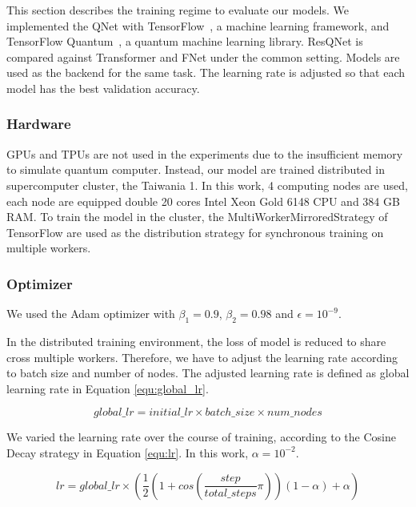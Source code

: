 This section describes the training regime to evaluate our models. We implemented the QNet with TensorFlow~\cite{abadi2016tensorflow}, a machine learning framework, and TensorFlow Quantum~\cite{broughton2020tensorflow}, a quantum machine learning library.
ResQNet is compared against Transformer and FNet under the common setting. Models are used as the backend for the same task. The learning rate is adjusted so that each model has the best validation accuracy.

\subsubsection{Hardware}

GPUs and TPUs are not used in the experiments due to the insufficient memory to simulate quantum computer. Instead, our model are trained distributed in supercomputer cluster, the Taiwania 1. In this work, 4 computing nodes are used, each node are equipped double 20 cores Intel Xeon Gold 6148 CPU and 384 GB RAM. To train the model in the cluster, the MultiWorkerMirroredStrategy of TensorFlow are used as the distribution strategy for synchronous training on multiple workers.

\subsubsection{Optimizer}

We used the Adam optimizer with $\beta_1 = 0.9$, $\beta_2 = 0.98$ and $\epsilon = 10^{-9}$.

In the distributed training environment, the loss of model is reduced to share cross multiple workers. Therefore, we have to adjust the learning rate according to batch size and number of nodes. The adjusted learning rate is defined as global learning rate in Equation \ref{equ:global_lr}.

\begin{equation} \label{equ:global_lr}
global\_lr = initial\_lr \times batch\_size \times num\_nodes
\end{equation}

We varied the learning rate over the course of training, according to the Cosine Decay strategy in Equation \ref{equ:lr}. In this work, $\alpha = 10^{-2}$.

\begin{equation} \label{equ:lr}
lr = global\_lr \times ( \frac{1}{2} (1 + cos( \frac{step}{total\_steps}\pi))(1 - \alpha) + \alpha)
\end{equation}

